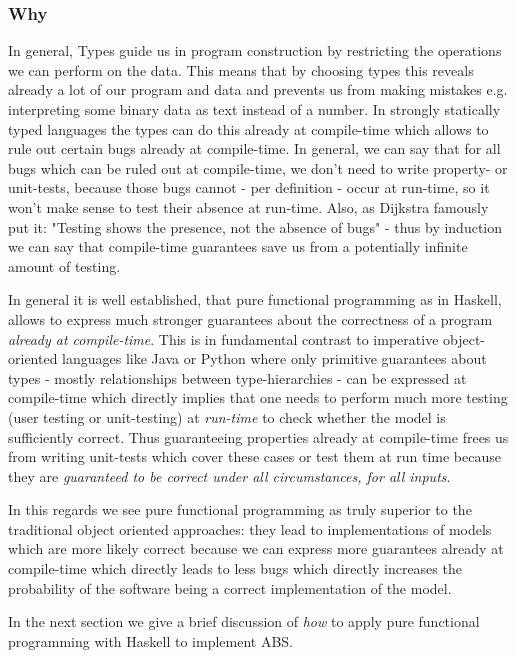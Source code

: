 \subsubsection{Why}
In general, Types guide us in program construction by restricting the operations we can perform on the data. This means that by choosing types this reveals already a lot of our program and data and prevents us from making mistakes e.g. interpreting some binary data as text instead of a number. In strongly statically typed languages the types can do this already at compile-time which allows to rule out certain bugs already at compile-time. In general, we can say that for all bugs which can be ruled out at compile-time, we don't need to write property- or unit-tests, because those bugs cannot - per definition - occur at run-time, so it won't make sense to test their absence at run-time. Also, as Dijkstra famously put it: "Testing shows the presence, not the absence of bugs" - thus by induction we can say that compile-time guarantees save us from a potentially infinite amount of testing.

In general it is well established, that pure functional programming as in Haskell, allows to express much stronger guarantees about the correctness of a program \textit{already at compile-time}. This is in fundamental contrast to imperative object-oriented languages like Java or Python where only primitive guarantees about types - mostly relationships between type-hierarchies - can be expressed at compile-time which directly implies that one needs to perform much more testing (user testing or unit-testing) at \textit{run-time} to check whether the model is sufficiently correct. Thus guaranteeing properties already at compile-time frees us from writing unit-tests which cover these cases or test them at run time because they are \textit{guaranteed to be correct under all circumstances, for all inputs}.

In this regards we see pure functional programming as truly superior to the traditional object oriented approaches: they lead to implementations of models which are more likely correct because we can express more guarantees already at compile-time which directly leads to less bugs which directly increases the probability of the software being a correct implementation of the model.

In the next section we give a brief discussion of \textit{how} to apply pure functional programming with Haskell to implement ABS.